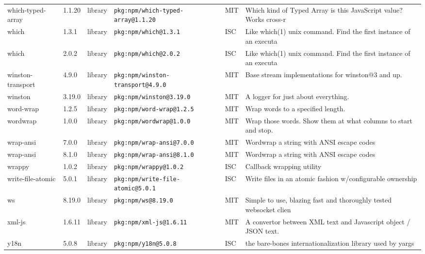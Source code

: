 \documentclass[11pt,a4paper]{article}
\begin{document}
\begin{longtable}{|p{4cm}|p{2cm}|p{1.6cm}|p{5cm}|p{1.5cm}|p{3.5cm}|}
\raggedright which-typed-array & 1.1.20 & library & \small\texttt{pkg:npm/which-typed-array@1.1.20} & MIT & \small Which kind of Typed Array is this JavaScript value? Works cross-r \\
\raggedright which & 1.3.1 & library & \small\texttt{pkg:npm/which@1.3.1} & ISC & \small Like which(1) unix command. Find the first instance of an executa \\
\raggedright which & 2.0.2 & library & \small\texttt{pkg:npm/which@2.0.2} & ISC & \small Like which(1) unix command. Find the first instance of an executa \\
\raggedright winston-transport & 4.9.0 & library & \small\texttt{pkg:npm/winston-transport@4.9.0} & MIT & \small Base stream implementations for winston@3 and up. \\
\raggedright winston & 3.19.0 & library & \small\texttt{pkg:npm/winston@3.19.0} & MIT & \small A logger for just about everything. \\
\raggedright word-wrap & 1.2.5 & library & \small\texttt{pkg:npm/word-wrap@1.2.5} & MIT & \small Wrap words to a specified length. \\
\raggedright wordwrap & 1.0.0 & library & \small\texttt{pkg:npm/wordwrap@1.0.0} & MIT & \small Wrap those words. Show them at what columns to start and stop. \\
\raggedright wrap-ansi & 7.0.0 & library & \small\texttt{pkg:npm/wrap-ansi@7.0.0} & MIT & \small Wordwrap a string with ANSI escape codes \\
\raggedright wrap-ansi & 8.1.0 & library & \small\texttt{pkg:npm/wrap-ansi@8.1.0} & MIT & \small Wordwrap a string with ANSI escape codes \\
\raggedright wrappy & 1.0.2 & library & \small\texttt{pkg:npm/wrappy@1.0.2} & ISC & \small Callback wrapping utility \\
\raggedright write-file-atomic & 5.0.1 & library & \small\texttt{pkg:npm/write-file-atomic@5.0.1} & ISC & \small Write files in an atomic fashion w/configurable ownership \\
\raggedright ws & 8.19.0 & library & \small\texttt{pkg:npm/ws@8.19.0} & MIT & \small Simple to use, blazing fast and thoroughly tested websocket clien \\
\raggedright xml-js & 1.6.11 & library & \small\texttt{pkg:npm/xml-js@1.6.11} & MIT & \small A convertor between XML text and Javascript object / JSON text. \\
\raggedright y18n & 5.0.8 & library & \small\texttt{pkg:npm/y18n@5.0.8} & ISC & \small the bare-bones internationalization library used by yargs \\

\end{longtable}
\end{document}
